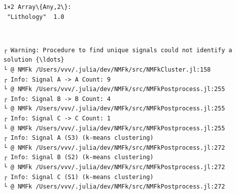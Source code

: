 \documentclass[11pt]{article}
\begin{document}
    
    
    \begin{Verbatim}[commandchars=\\\{\}]
1×2 Array\{Any,2\}:
 "Lithology"  1.0
    \end{Verbatim}

    
    \begin{center}
    \end{center}
    { \hspace*{\fill} \\}
    
    \begin{Verbatim}[commandchars=\\\{\}]
┌ Warning: Procedure to find unique signals could not identify a solution {\ldots}
└ @ NMFk /Users/vvv/.julia/dev/NMFk/src/NMFkCluster.jl:158
┌ Info: Signal A -> A Count: 9
└ @ NMFk /Users/vvv/.julia/dev/NMFk/src/NMFkPostprocess.jl:255
┌ Info: Signal B -> B Count: 4
└ @ NMFk /Users/vvv/.julia/dev/NMFk/src/NMFkPostprocess.jl:255
┌ Info: Signal C -> C Count: 1
└ @ NMFk /Users/vvv/.julia/dev/NMFk/src/NMFkPostprocess.jl:255
┌ Info: Signal A (S3) (k-means clustering)
└ @ NMFk /Users/vvv/.julia/dev/NMFk/src/NMFkPostprocess.jl:272
┌ Info: Signal B (S2) (k-means clustering)
└ @ NMFk /Users/vvv/.julia/dev/NMFk/src/NMFkPostprocess.jl:272
┌ Info: Signal C (S1) (k-means clustering)
└ @ NMFk /Users/vvv/.julia/dev/NMFk/src/NMFkPostprocess.jl:272
    \end{Verbatim}

    \begin{center}
    \end{center}
    { \hspace*{\fill} \\}
    
    \begin{Verbatim}[commandchars=\\\{\}]

    \end{Verbatim}

    \begin{center}
    \end{center}
    { \hspace*{\fill} \\}
    
\end{document}
